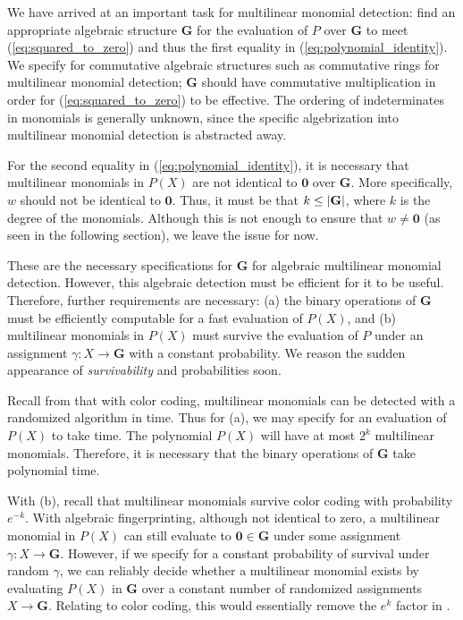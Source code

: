 We have arrived at an important task for multilinear monomial detection: 
find an appropriate algebraic structure $\mathbf{G}$ for 
the evaluation of $P$ over $\mathbf{G}$ to meet 
(\ref{eq:squared_to_zero}) and thus the first equality in (\ref{eq:polynomial_identity}). 
We specify for commutative algebraic structures such as 
commutative rings for multilinear monomial detection; 
$\mathbf{G}$ should have commutative multiplication in order for (\ref{eq:squared_to_zero}) 
to be effective. The ordering of indeterminates in monomials is generally unknown, 
since the specific algebrization into multilinear monomial detection 
is abstracted away. %

For the second equality in (\ref{eq:polynomial_identity}), it is necessary that multilinear 
monomials in $P(X)$ are not identical to $\mathbf{0}$ over $\mathbf{G}$. 
More specifically, 
$w$ should not be identical to $\mathbf{0}$. 
Thus, it must be that $k \leq {\left\vert\mathbf{G}\right\vert}$, where $k$ is the degree of the monomials. 
Although this is not enough to ensure that $w \neq \mathbf{0}$ (as seen in the following section), 
we leave the issue for now.

These are the necessary specifications for $\mathbf{G}$ for algebraic multilinear monomial detection. 
However, this algebraic detection must be efficient for it to be useful. 
Therefore, further requirements are necessary: (a) the binary operations of $\mathbf{G}$ 
must be efficiently computable 
for a fast evaluation of $P(X)$, and (b) multilinear monomials in $P(X)$ must 
survive the evaluation of $P$ under an assignment $\gamma \colon X \to \mathbf{G}$ 
with a constant probability. We reason the 
sudden appearance of \emph{survivability} and probabilities soon.

Recall from  
that with color coding, multilinear monomials can be detected with a 
randomized algorithm in  time. Thus for (a), we may specify for 
an evaluation of $P(X)$ to take  time. The polynomial $P(X)$ 
will have at most $2^k$ multilinear monomials. Therefore, 
it is necessary that the binary operations 
of $\mathbf{G}$ take polynomial time.

With (b), recall that multilinear monomials 
survive color coding with probability $e^{-k}$. 
With algebraic fingerprinting, although not identical to zero, a multilinear monomial in $P(X)$ 
can still evaluate to $\mathbf{0} \in \mathbf{G}$ under some assignment $\gamma \colon X \to \mathbf{G}$. 
However, if we specify for a constant 
probability of survival under random $\gamma$, we can reliably decide whether a multilinear monomial exists 
by evaluating $P(X)$ in $\mathbf{G}$ over a constant number of 
randomized assignments $X \to \mathbf{G}$. Relating to color coding, 
this would essentially remove the 
$e^k$ factor in .

